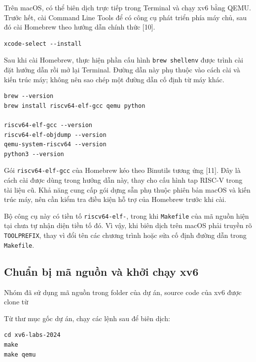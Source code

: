 \documentclass[12pt,a4paper]{article}
\begin{document}
Trên macOS, có thể biên dịch trực tiếp trong Terminal và chạy xv6 bằng QEMU. Trước hết, cài Command Line Tools để có công cụ phát triển phía máy chủ, sau đó cài Homebrew theo hướng dẫn chính thức [10].

\begin{terminalbox}
\small
\begin{verbatim}
xcode-select --install
\end{verbatim}
\end{terminalbox}

Sau khi cài Homebrew, thực hiện phần cấu hình \texttt{brew shellenv} được trình cài đặt hướng dẫn rồi mở lại Terminal. Đường dẫn này phụ thuộc vào cách cài và kiến trúc máy; không nên sao chép một đường dẫn cố định từ máy khác.

\begin{terminalbox}
\small
\begin{verbatim}
brew --version
brew install riscv64-elf-gcc qemu python

riscv64-elf-gcc --version
riscv64-elf-objdump --version
qemu-system-riscv64 --version
python3 --version
\end{verbatim}
\end{terminalbox}

Gói \texttt{riscv64-elf-gcc} của Homebrew kéo theo Binutils tương ứng [11]. Đây là cách cài được dùng trong hướng dẫn này, thay cho cấu hình tap RISC-V trong tài liệu cũ. Khả năng cung cấp gói dựng sẵn phụ thuộc phiên bản macOS và kiến trúc máy, nên cần kiểm tra điều kiện hỗ trợ của Homebrew trước khi cài.

Bộ công cụ này có tiền tố \texttt{riscv64-elf-}, trong khi \texttt{Makefile} của mã nguồn hiện tại chưa tự nhận diện tiền tố đó. Vì vậy, khi biên dịch trên macOS phải truyền rõ \texttt{TOOLPREFIX}, thay vì đổi tên các chương trình hoặc sửa cố định đường dẫn trong \texttt{Makefile}.

\subsection{Chuẩn bị mã nguồn và khởi chạy xv6}

Nhóm đã sử dụng mã nguồn trong folder  của dự án, source code của xv6 được clone từ 

Từ thư mục gốc dự án, chạy các lệnh sau để biên dịch:

\begin{terminalbox}[title={Ubuntu trên WSL 2}]
\small
\begin{verbatim}
cd xv6-labs-2024
make
make qemu
\end{verbatim}
\end{terminalbox}
\end{document}
